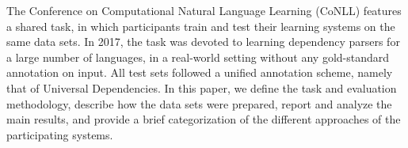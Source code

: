The Conference on Computational Natural Language Learning (CoNLL) features a shared task, in which participants train and test their learning systems on the same data sets. In 2017, the task was devoted to learning dependency parsers for a large number of languages, in a real-world setting without any gold-standard annotation on input. All test sets followed a unified annotation scheme, namely that of Universal Dependencies. In this paper, we define the task and evaluation methodology, describe how the data sets were prepared, report and analyze the main results, and provide a brief categorization of the different approaches of the participating systems.
